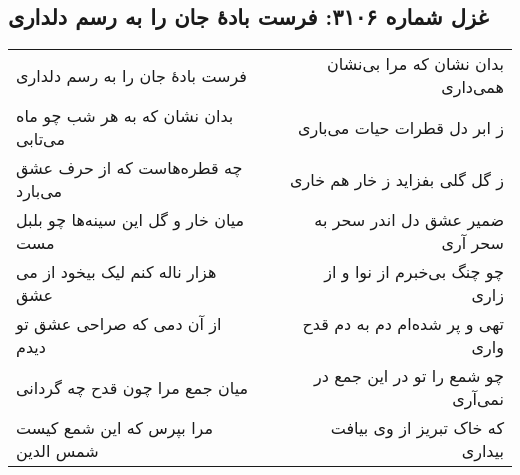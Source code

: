 \begin{center}
\section*{غزل شماره ۳۱۰۶: فرست بادهٔ جان را به رسم دلداری}
\label{sec:3106}
\begin{longtable}{l p{0.5cm} r}
فرست بادهٔ جان را به رسم دلداری
&&
بدان نشان که مرا بی‌نشان همی‌داری
\\
بدان نشان که به هر شب چو ماه می‌تابی
&&
ز ابر دل قطرات حیات می‌باری
\\
چه قطره‌هاست که از حرف عشق می‌بارد
&&
ز گل گلی بفزاید ز خار هم خاری
\\
میان خار و گل این سینه‌ها چو بلبل مست
&&
ضمیر عشق دل اندر سحر به سحر آری
\\
هزار ناله کنم لیک بیخود از می عشق
&&
چو چنگ بی‌خبرم از نوا و از زاری
\\
از آن دمی که صراحی عشق تو دیدم
&&
تهی و پر شده‌ام دم به دم قدح واری
\\
میان جمع مرا چون قدح چه گردانی
&&
چو شمع را تو در این جمع در نمی‌آری
\\
مرا بپرس که این شمع کیست شمس الدین
&&
که خاک تبریز از وی بیافت بیداری
\\
\end{longtable}
\end{center}
